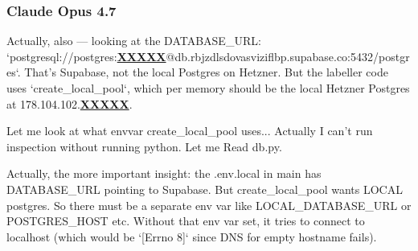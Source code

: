 \subsubsection{Claude Opus 4.7}
\begin{decodedreasoningpanel}
{\obeylines\setlength{\parindent}{0pt}%
Actually, also --- looking at the DATABASE\_URL: `postgresql://postgres:\underline{\textbf{XXXXX}}@db.rbjzdlsdovasviziflbp.supabase.co:5432/postgres`. That's Supabase, not the local Postgres on Hetzner. But the labeller code uses `create\_local\_pool`, which per memory should be the local Hetzner Postgres at 178.104.102.\underline{\textbf{XXXXX}}.

Let me look at what envvar create\_local\_pool uses... Actually I can't run inspection without running python. Let me Read db.py.

Actually, the more important insight: the .env.local in main has DATABASE\_URL pointing to Supabase. But create\_local\_pool wants LOCAL postgres. So there must be a separate env var like LOCAL\_DATABASE\_URL or POSTGRES\_HOST etc. Without that env var set, it tries to connect to localhost (which would be `[Errno 8]` since DNS for empty hostname fails).}
\end{decodedreasoningpanel}
